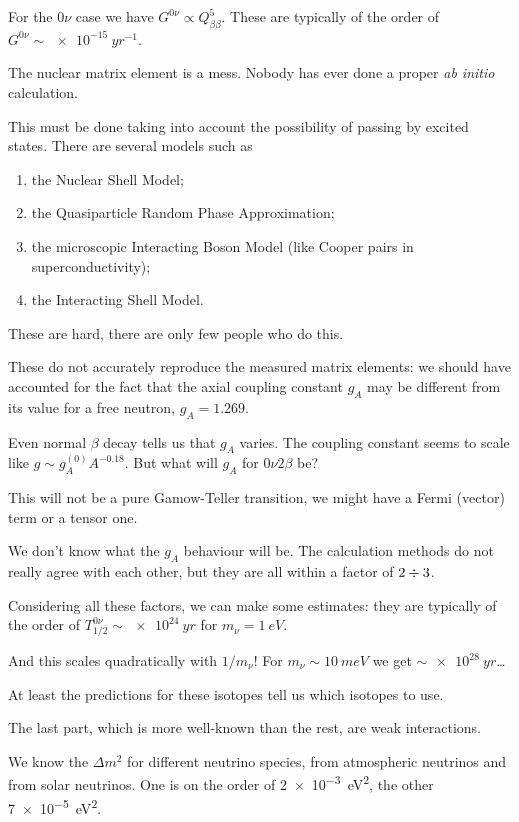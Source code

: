 \documentclass[main.tex]{subfiles}
\begin{document}
For the \(0 \nu \) case we have \(G^{0 \nu } \propto Q^{5}_{\beta \beta }\). 
These are typically of the order of \(G^{0 \nu } \sim \SI{e-15}{yr^{-1}}\). 

The nuclear matrix element is a mess.
Nobody has ever done a proper \emph{ab initio} calculation.

This must be done taking into account the possibility of passing by excited states. 
There are several models such as 
\begin{enumerate}
    \item the Nuclear Shell Model;
    \item the Quasiparticle Random Phase Approximation;
    \item the microscopic Interacting Boson Model (like Cooper pairs in superconductivity);
    \item the Interacting Shell Model. 
\end{enumerate}

These are hard, there are only few people who do this. 

These do not accurately reproduce the measured matrix elements: 
we should have accounted for the fact that the 
axial coupling constant \(g_A\) may be different from its value 
for a free neutron, \(g_A = 1.269\). 

Even normal \(\beta \) decay tells us that \(g_A\) varies. 
The coupling constant seems to scale like \(g \sim g_A^{(0)} A^{-0.18}\). 
But what will \(g_A\) for \(0 \nu 2 \beta \) be? 

This will not be a pure Gamow-Teller transition, we might have a Fermi (vector) 
term or a tensor one. 

We don't know what the \(g_A\) behaviour will be. 
The calculation methods do not really agree with each other, but they
are all within a factor of \(2 \divisionsymbol 3\). 

Considering all these factors, we can make some estimates: they are typically 
of the order of \(T_{1/2}^{0 \nu } \sim \SI{e24}{yr}\) for \(m_\nu = \SI{1}{eV}\). 

And this scales quadratically with \(1 / m_\nu \)! For \(m_\nu \sim \SI{10}{meV}\) we get \(\sim \SI{e28}{yr}\)\dots

At least the predictions for these isotopes tell us which isotopes to use. 

The last part, which is more well-known than the rest, are weak interactions. 

We know the \(\Delta m^2\) for different neutrino species, 
from atmospheric neutrinos and from solar neutrinos. 
One is on the order of \SI{2e-3}{eV^2}, the other \SI{7e-5}{eV^2}. 
\end{document}

